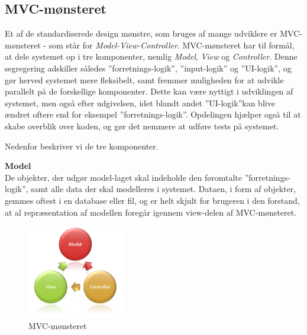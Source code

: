 \subsection{MVC-mønsteret}\label{MVC}

Et af de standardiserede design mønstre, som bruges af mange udviklere er MVC-mønsteret - som står for \textit{Model-View-Controller}.
MVC-mønsteret har til formål, at dele systemet op i tre komponenter, nemlig \textit{Model}, \textit{View} og \textit{Controller}.
Denne segregering adskiller således ''forretnings-logik'', ''input-logik'' og ''UI-logik'', og gør herved systemet mere fleksibelt, samt fremmer muligheden for at udvikle parallelt på de forskellige komponenter.
Dette kan være nyttigt i udviklingen af systemet, men også efter udgivelsen, idet blandt andet ''UI-logik''kan blive ændret oftere end for eksempel ''forretnings-logik''.
Opdelingen hjælper også til at skabe overblik over koden, og gør det nemmere at udføre tests på systemet. \citep{MVC_Overview}

Nedenfor beskriver vi de tre komponenter.

\textbf{Model}\\
De objekter, der udgør model-laget skal indeholde den føromtalte ''forretnings-logik'', samt alle data der skal modelleres i systemet.
Dataen, i form af objekter, gemmes oftest i en database eller fil, og er helt skjult for brugeren i den forstand, at al repræsentation af modellen foregår igennem view-delen af MVC-mønsteret.

\begin{figure}
	\vspace{0pt}
	\begin{center}
		\includegraphics[width=0.38\textwidth]{images/Images/mvc.png}
	\end{center}
	\vspace{-20pt}
	\caption{MVC-mønsteret}
	\vspace{-30pt}
\end{figure}

